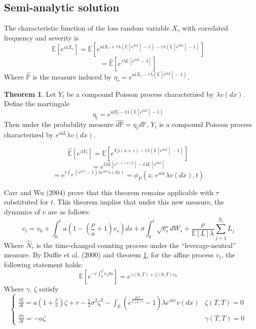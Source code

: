 \documentclass{article}
\theoremstyle{definition}
\newtheorem{theorem}{Theorem}
\newenvironment{sketchproof}{%
  \renewcommand{\proofname}{Sketch of Proof}\proof}{\endproof}
\begin{document}
\subsection{Semi-analytic solution}
The characteristic function of the loss random variable \(X_\tau\) with correlated frequency and severity is 
\[\mathbb{E}[e^{u\mathrm{i}X_\tau}]=\mathbb{E}\left[e^{u\mathrm{i}X_\tau+ \tau \lambda  \left(\mathbb{E}\left[e^{\mathrm{i}uL}\right]-1\right)- \tau \lambda \left(\mathbb{E}\left[e^{\mathrm{i}uL}\right]-1\right)}\right]\]
\[=\mathbb{\hat{E}} \left[e^{\tau \lambda \mathbb{E}\left[e^{\mathrm{i}uL}-1\right]}\right]\]
Where \(\mathbb{\hat{P}}\) is the measure induced by \(\eta_\tau=e^{u\mathrm{i}X_\tau- \tau\lambda \left(\mathbb{E}\left[e^{\mathrm{i}uL}\right]-1\right)}\).  
\begin{theorem}\label{theorem1}
Let \(Y_t\) be a compound Poisson process characterized by \(\lambda v(dx)\).  Define the martingale
\begin{equation}\eta_t=e^{u\mathrm{i}Y_t- t\lambda \left(\mathbb{E}\left[e^{\mathrm{i}uL}\right]-1\right)}\end{equation}
Then under the probability measure \(\hat{d\mathbb{P}}=\eta_t d\mathbb{P}\), \(Y_t\) is a compound Poisson process characterized by \(e^{u\mathrm{i}L}\lambda v(dx)\).
\end{theorem}
\begin{sketchproof}
\[\mathbb{\hat{E}}\left[e^{z\mathrm{i}Y_t}\right]=\mathbb{E}\left[e^{Y_t \mathrm{i} (u+z)-t\lambda \left(\mathbb{E}\left[e^{\mathrm{i}uL}\right]-1\right)}\right]\]
\[=e^{t\lambda \mathbb{E}\left[e^{\mathrm{i}(z+u)L}\right]-t\lambda \mathbb{E}\left[e^{\mathrm{i}uL}\right]}\]
\[=e^{t \int_{R} \left(e^{\mathrm{i}zx}-1\right)\lambda e^{\mathrm{i}ux}v(dx)}=\phi_{P} (z;\,e^{u\mathrm{i}x}\lambda v(dx), t)\]
\end{sketchproof}

Carr and Wu (2004) prove that this theorem remains applicable with \(\tau\) substituted for \(t\).  This theorem implies that under this new measure, the dynamics of \(v\) are as follows:
\begin{equation}\label{tmcLN}v_t=v_0+\int_0 ^t a\left(1-\left(\frac{\rho}{a}+1\right)v_s\right)ds+\sigma \int_0 ^ t \sqrt{v_s} dW_s +\frac{\rho}{\mathbb{E}[L] \lambda} \sum_{j=1} ^ {\hat{N}_\tau} L_j \end{equation}
Where \(\hat{N}_\tau\) is the time-changed counting process under the ``leverage-neutral'' measure.   By Duffie et al. (2000) and theorem \ref{theorem1}, for the affine process \(v_t\), the following statement holds:
\[\mathbb{E} \left[e^{-r\int_0 ^ {T} v_s ds}\right]=e^{\gamma(0, T)+\zeta(0, T)v_0}\]
Where \(\gamma,\,\zeta\) satisfy
\[
\begin{cases}
\frac{\partial \zeta}{\partial t}=a\left(1+\frac{\rho}{a}\right) \zeta+r-\frac{1}{2} \sigma^2 \zeta^2 - \int_{\mathbb{R}} \left(e^{\frac{\rho \zeta x}{\mathbb{E}[L] \lambda}}-1\right)\lambda e^{u\mathrm{i}x} v(dx) & \zeta(T, T)=0\\
\frac{\partial \gamma}{\partial t}=-a \zeta & \gamma(T, T)=0
\end{cases} \]
\end{document}
